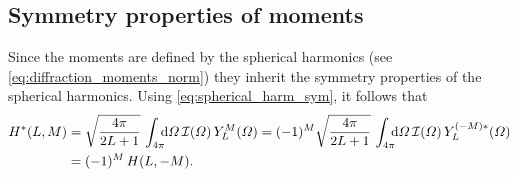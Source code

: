 \subsection{Symmetry properties of moments}%
\label{sec:diffraction:moments_sym}

Since the moments are defined by the spherical harmonics (see
\cref{eq:diffraction_moments_norm}) they inherit the symmetry
properties of the spherical harmonics.  Using
\cref{eq:spherical_harm_sym}, it follows that
\begin{align}
  H^*(L, M)
  ={}& \sqrt{\frac{4 \pi}{2 L + 1}}\, \int_{4 \pi}\!\!\! \dif{\Omega}\, \mathcal{I}(\Omega)\, Y_L^M(\Omega)
  = (-1)^M \sqrt{\frac{4 \pi}{2 L + 1}}\, \int_{4 \pi}\!\!\! \dif{\Omega}\, \mathcal{I}(\Omega)\, Y_L^{(-M) *}(\Omega) \notag
  \\
  \label{eq:diffraction_moment_sym_1}
  ={}& (-1)^M\, H(L, -M).
\end{align}

